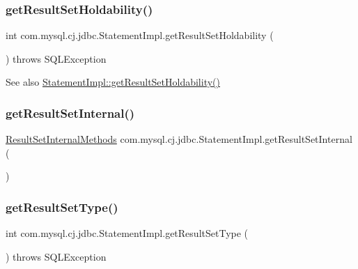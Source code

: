 \subsubsection{\texorpdfstring{get\+Result\+Set\+Holdability()}{getResultSetHoldability()}}
{\footnotesize\ttfamily int com.\+mysql.\+cj.\+jdbc.\+Statement\+Impl.\+get\+Result\+Set\+Holdability (\begin{DoxyParamCaption}{ }\end{DoxyParamCaption}) throws S\+Q\+L\+Exception}

\begin{DoxySeeAlso}{See also}
\mbox{\hyperlink{classcom_1_1mysql_1_1cj_1_1jdbc_1_1_statement_impl_a84b0f5b22d3ce2bd808aceb6c17e4620}{Statement\+Impl\+::get\+Result\+Set\+Holdability()}} 
\end{DoxySeeAlso}
\mbox{\label{classcom_1_1mysql_1_1cj_1_1jdbc_1_1_statement_impl_a9e9be16d68c66d0ad86147417269fee3}} 
\subsubsection{\texorpdfstring{get\+Result\+Set\+Internal()}{getResultSetInternal()}}
{\footnotesize\ttfamily \mbox{\hyperlink{interfacecom_1_1mysql_1_1cj_1_1jdbc_1_1result_1_1_result_set_internal_methods}{Result\+Set\+Internal\+Methods}} com.\+mysql.\+cj.\+jdbc.\+Statement\+Impl.\+get\+Result\+Set\+Internal (\begin{DoxyParamCaption}{ }\end{DoxyParamCaption})\hspace{0.3cm}{\ttfamily [protected]}}

\mbox{\label{classcom_1_1mysql_1_1cj_1_1jdbc_1_1_statement_impl_a0845a6219a16770f3675269fc28ade3b}} 
\subsubsection{\texorpdfstring{get\+Result\+Set\+Type()}{getResultSetType()}}
{\footnotesize\ttfamily int com.\+mysql.\+cj.\+jdbc.\+Statement\+Impl.\+get\+Result\+Set\+Type (\begin{DoxyParamCaption}{ }\end{DoxyParamCaption}) throws S\+Q\+L\+Exception}

